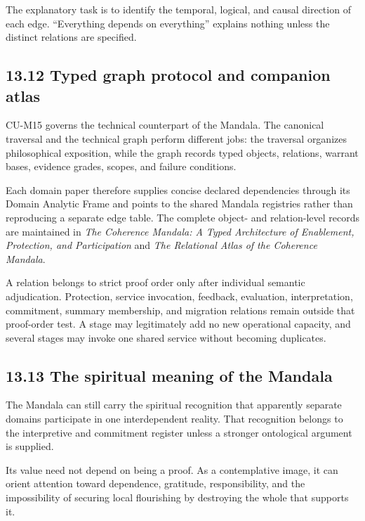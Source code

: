 \documentclass[
  11pt,
]{article}
\begin{document}
The explanatory task is to identify the temporal, logical, and causal
direction of each edge. ``Everything depends on everything'' explains
nothing unless the distinct relations are specified.

\subsection{13.12 Typed graph protocol and companion
atlas}\label{typed-graph-protocol-and-companion-atlas}

CU-M15 governs the technical counterpart of the Mandala. The canonical
traversal and the technical graph perform different jobs: the traversal
organizes philosophical exposition, while the graph records typed
objects, relations, warrant bases, evidence grades, scopes, and failure
conditions.

Each domain paper therefore supplies concise declared dependencies
through its Domain Analytic Frame and points to the shared Mandala
registries rather than reproducing a separate edge table. The complete
object- and relation-level records are maintained in \emph{The Coherence
Mandala: A Typed Architecture of Enablement, Protection, and
Participation} and \emph{The Relational Atlas of the Coherence Mandala}.

A relation belongs to strict proof order only after individual semantic
adjudication. Protection, service invocation, feedback, evaluation,
interpretation, commitment, summary membership, and migration relations
remain outside that proof-order test. A stage may legitimately add no
new operational capacity, and several stages may invoke one shared
service without becoming duplicates.

\subsection{13.13 The spiritual meaning of the
Mandala}\label{the-spiritual-meaning-of-the-mandala}

The Mandala can still carry the spiritual recognition that apparently
separate domains participate in one interdependent reality. That
recognition belongs to the interpretive and commitment register unless a
stronger ontological argument is supplied.

Its value need not depend on being a proof. As a contemplative image, it
can orient attention toward dependence, gratitude, responsibility, and
the impossibility of securing local flourishing by destroying the whole
that supports it.
\end{document}
